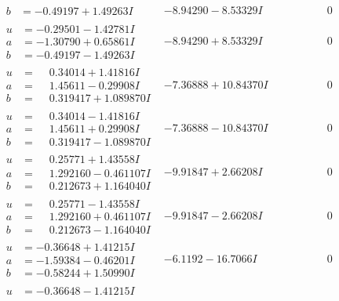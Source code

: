 \documentclass[1p]{elsarticle_modified}
\theoremstyle{definition}
\begin{document}
$$\begin{array}{c|c|c}
\begin{aligned}
b &= -0.49197 + 1.49263 I\end{aligned}
 & -8.94290 - 8.53329 I & \phantom{-0.000000 } 0 \\ \hline\begin{aligned}
u &= -0.29501 - 1.42781 I \\
a &= -1.30790 + 0.65861 I \\
b &= -0.49197 - 1.49263 I\end{aligned}
 & -8.94290 + 8.53329 I & \phantom{-0.000000 } 0 \\ \hline\begin{aligned}
u &= \phantom{-}0.34014 + 1.41816 I \\
a &= \phantom{-}1.45611 - 0.29908 I \\
b &= \phantom{-}0.319417 + 1.089870 I\end{aligned}
 & -7.36888 + 10.84370 I & \phantom{-0.000000 } 0 \\ \hline\begin{aligned}
u &= \phantom{-}0.34014 - 1.41816 I \\
a &= \phantom{-}1.45611 + 0.29908 I \\
b &= \phantom{-}0.319417 - 1.089870 I\end{aligned}
 & -7.36888 - 10.84370 I & \phantom{-0.000000 } 0 \\ \hline\begin{aligned}
u &= \phantom{-}0.25771 + 1.43558 I \\
a &= \phantom{-}1.292160 - 0.461107 I \\
b &= \phantom{-}0.212673 + 1.164040 I\end{aligned}
 & -9.91847 + 2.66208 I & \phantom{-0.000000 } 0 \\ \hline\begin{aligned}
u &= \phantom{-}0.25771 - 1.43558 I \\
a &= \phantom{-}1.292160 + 0.461107 I \\
b &= \phantom{-}0.212673 - 1.164040 I\end{aligned}
 & -9.91847 - 2.66208 I & \phantom{-0.000000 } 0 \\ \hline\begin{aligned}
u &= -0.36648 + 1.41215 I \\
a &= -1.59384 - 0.46201 I \\
b &= -0.58244 + 1.50990 I\end{aligned}
 & -6.1192 - 16.7066 I & \phantom{-0.000000 } 0 \\ \hline\begin{aligned}
u &= -0.36648 - 1.41215 I \\

\end{aligned}
\end{array}$$
\end{document}
